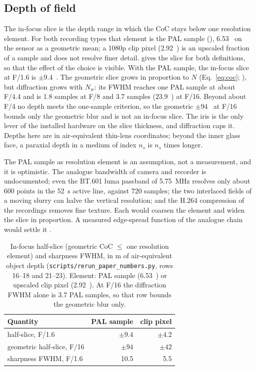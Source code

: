 \subsection{Depth of field}\label{sec:dof}

The in-focus slice is the depth range in which the CoC stays below one resolution element. For both recording types
that element is the PAL sample (), 6.53~\um{} on the sensor as a geometric mean; a 1080p clip
pixel (2.92~\um) is an upscaled fraction of a sample and does not resolve finer detail.  gives the
slice for both definitions, so that the effect of the choice is visible. With the PAL sample, the in-focus slice at
F/1.6 is $\pm 9.4$~\um. The geometric slice grows in proportion to $N$ (Eq.~\ref{eq:coc}; ), but
diffraction grows with $N_w$: its FWHM reaches one PAL sample at about F/4.4 and is 1.8 samples at F/8 and 3.7
samples (23.9~\um) at F/16. Beyond about F/4 no depth meets the one-sample criterion, so the geometric $\pm 94$~\um{}
at F/16 bounds only the geometric blur and is not an in-focus slice. The iris is the only lever of the installed
hardware on the slice thickness, and diffraction caps it. Depths here are in air-equivalent thin-lens coordinates;
beyond the inner glass face, a paraxial depth in a medium of index $n_s$ is $n_s$ times longer.

The PAL sample as resolution element is an assumption, not a measurement, and it is optimistic. The analogue
bandwidth of camera and recorder is undocumented; even the BT.601 luma passband of 5.75~MHz \citep{ITUBT601}
resolves only about 600 points in the 52~\textmu s active line, against 720 samples; the two
interlaced fields of a moving slurry can halve the vertical resolution; and the H.264 compression of the recordings
removes fine texture. Each would coarsen the element and widen the slice in proportion. A measured edge-spread
function of the analogue chain would settle it .

\begin{table}
\centering\tabfont
\caption{In-focus half-slice (geometric CoC $\le$ one resolution element) and sharpness FWHM, in \textmu m of
air-equivalent object depth (\texttt{scripts/rerun\_paper\_numbers.py}, rows 16--18 and 21--23). Element: PAL sample
(6.53~\um) or upscaled clip pixel (2.92~\um). At F/16 the diffraction FWHM alone is 3.7 PAL samples, so that row
bounds the geometric blur only.}\label{tab:dof}
\begin{tabular}{@{}lrr@{}}
\toprule
Quantity & PAL sample & clip pixel \\
\midrule
half-slice, F/1.6 & $\pm 9.4$ & $\pm 4.2$ \\
geometric half-slice, F/16 & $\pm 94$ & $\pm 42$ \\
sharpness FWHM, F/1.6 & 10.5 & 5.5 \\
\bottomrule
\end{tabular}
\end{table}

